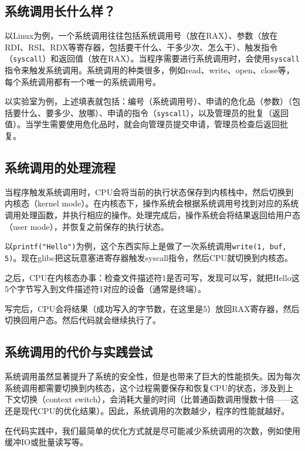 \documentclass[../main.tex]{subfiles}
\begin{document}
\subsection{系统调用长什么样？}

以Linux为例，一个系统调用往往包括系统调用号（放在RAX）、参数（放在RDI、RSI、RDX等寄存器，包括要干什么、干多少次、怎么干）、触发指令（\texttt{syscall}）和返回值（放在RAX）。当程序需要进行系统调用时，会使用\texttt{syscall}指令来触发系统调用。系统调用的种类很多，例如read、write、open、close等，每个系统调用都有一个唯一的系统调用号。

以实验室为例，上述填表就包括：编号（系统调用号）、申请的危化品（参数）（包括要什么、要多少、放哪）、申请的指令（\texttt{syscall}），以及管理员的批复（返回值）。当学生需要使用危化品时，就会向管理员提交申请，管理员检查后返回批复。

\subsection{系统调用的处理流程}

当程序触发系统调用时，CPU会将当前的执行状态保存到内核栈中，然后切换到内核态（kernel mode）。在内核态下，操作系统会根据系统调用号找到对应的系统调用处理函数，并执行相应的操作。处理完成后，操作系统会将结果返回给用户态（user mode），并恢复之前保存的执行状态。

以\texttt{printf("Hello")}为例，这个东西实际上是做了一次系统调用\texttt{write(1, buf, 5)}。现在glibc把这玩意塞进寄存器触发syscall指令，然后CPU就切换到内核态。

之后，CPU在内核态办事：检查文件描述符1是否可写，发现可以写，就把Hello这5个字节写入到文件描述符1对应的设备（通常是终端）。

写完后，CPU会将结果（成功写入的字节数，在这里是5）放回RAX寄存器，然后切换回用户态。然后代码就会继续执行了。

\subsection{系统调用的代价与实践尝试}

系统调用虽然显著提升了系统的安全性，但是也带来了巨大的性能损失。因为每次系统调用都需要切换到内核态，这个过程需要保存和恢复CPU的状态，涉及到上下文切换（context switch），会消耗大量的时间（比普通函数调用慢数十倍——这还是现代CPU的优化结果）。因此，系统调用的次数越少，程序的性能就越好。

在代码实践中，我们最简单的优化方式就是尽可能减少系统调用的次数，例如使用缓冲IO或批量读写等。
\end{document}

